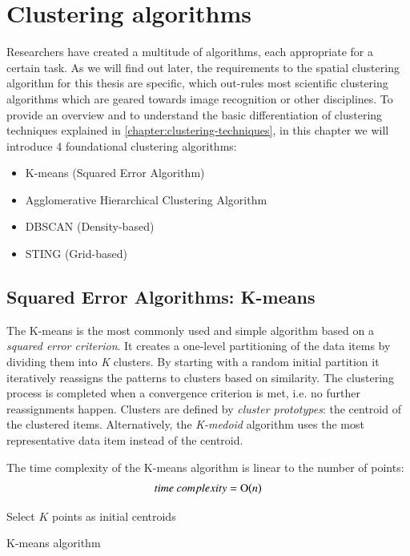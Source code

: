 
%
%

\section{Clustering algorithms}

Researchers have created a multitude of algorithms, each appropriate for a certain task. As we will find out later, the requirements to the spatial clustering algorithm for this thesis are specific, which out-rules most scientific clustering algorithms which are geared towards image recognition or other disciplines. To provide an overview and to understand the basic differentiation of clustering techniques explained in \ref{chapter:clustering-techniques}, in this chapter we will introduce 4 foundational clustering algorithms:
\begin{itemize}
\item {K-means (Squared Error Algorithm)}
\item {Agglomerative Hierarchical Clustering Algorithm}
\item {DBSCAN (Density-based)}
\item {STING (Grid-based)}
\end{itemize}

\subsection{Squared Error Algorithms: K-means}

The K-means is the most commonly used and simple algorithm based on a \textit{squared error criterion}. It creates a one-level partitioning of the data items by dividing them into \textit{K} clusters. By starting with a random initial partition it iteratively reassigns the patterns to clusters based on similarity.  The clustering process is completed when a convergence criterion is met, i.e. no further reassignments happen. Clusters are defined by \textit{cluster prototypes}: the centroid of the clustered items. Alternatively, the \textit{K-medoid} algorithm uses the most representative data item instead of the centroid.

The time complexity of the K-means algorithm is linear to the number of points:
\[time~complexity = \operatorname{O}\bigl(n\bigr)\]

\begin{algorithm}[t]
  \BlankLine
  {Select $K$ points as initial centroids}\;
  \caption{K-means algorithm~\cite{Meert06clustermaps}}
  \label{alg:k-means}
\end{algorithm}

